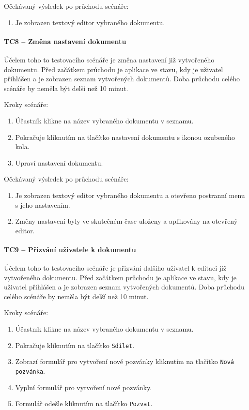 Očekávaný výsledek po průchodu scénáře:
\begin{enumerate}
    \item Je zobrazen textový editor vybraného dokumentu.
\end{enumerate}

\paragraph{TC8 -- Změna nastavení dokumentu}

Účelem toho to testovacího scénáře je změna nastavení již vytvořeného dokumentu.
Před začátkem průchodu je aplikace ve stavu, kdy je uživatel přihlášen a je zobrazen seznam vytvořených dokumentů.
Doba průchodu celého scénáře by neměla být delší než 10 minut.

Kroky scénáře:
\begin{enumerate}
    \item Účastník klikne na název vybraného dokumentu v seznamu.
    \item Pokračuje kliknutím na tlačítko nastavení dokumentu s ikonou ozubeného kola.
    \item Upraví nastavení dokumentu.
\end{enumerate}

Očekávaný výsledek po průchodu scénáře:
\begin{enumerate}
    \item Je zobrazen textový editor vybraného dokumentu a otevřeno postranní menu s jeho nastavením.
    \item Změny nastavení byly ve skutečném čase uloženy a aplikovány na otevřený editor.
\end{enumerate}

\paragraph{TC9 -- Přizvání uživatele k dokumentu}

Účelem toho to testovacího scénáře je přizvání dalšího uživatel k editaci již vytvořeného dokumentu.
Před začátkem průchodu je aplikace ve stavu, kdy je uživatel přihlášen a je zobrazen seznam vytvořených dokumentů.
Doba průchodu celého scénáře by neměla být delší než 10 minut.

Kroky scénáře:
\begin{enumerate}
    \item Účastník klikne na název vybraného dokumentu v seznamu.
    \item Pokračuje kliknutím na tlačítko \texttt{Sdílet}.
    \item Zobrazí formulář pro vytvoření nové pozvánky kliknutím na tlačítko \texttt{Nová pozvánka}.
    \item Vyplní formulář pro vytvoření nové pozvánky.
    \item Formulář odešle kliknutím na tlačítko \texttt{Pozvat}.
\end{enumerate}

